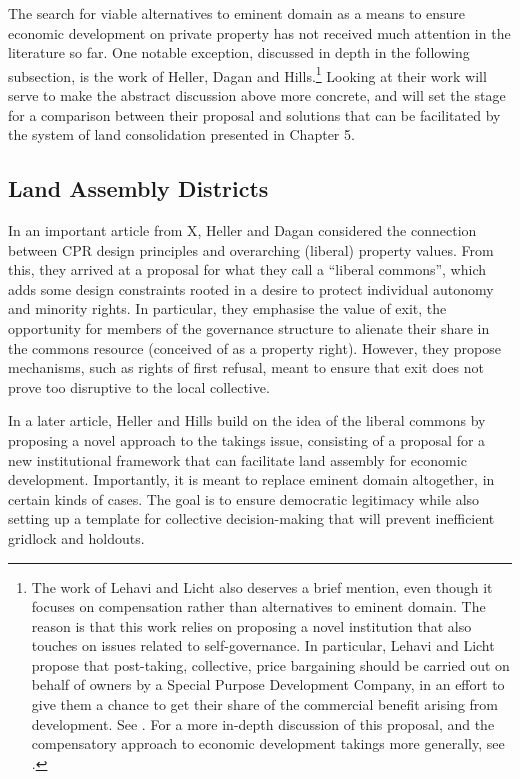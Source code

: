 The search for viable alternatives to eminent domain as a means to ensure economic development on  private property has not received much attention in the literature so far. One notable exception, discussed in depth in the following subsection, is the work of Heller, Dagan and Hills.\footnote{The work of Lehavi and Licht also deserves a brief mention, even though it focuses on compensation rather than alternatives to eminent domain. The reason is that this work relies on proposing a novel institution that also touches on issues related to self-governance. In particular, Lehavi and Licht propose that post-taking, collective, price bargaining should be carried out on behalf of owners by a Special Purpose Development Company, in an effort to give them a chance to get their share of the commercial benefit arising from development. See \cite{lehavi07}. For a more in-depth discussion of this proposal, and the compensatory approach to economic development takings more generally, see \cite{dyrkolbotn15}.} Looking at their work will serve to make the abstract discussion above more concrete, and will set the stage for a comparison between their proposal and solutions that can be facilitated by the system of land consolidation presented in Chapter 5.

\subsection{Land Assembly Districts}\label{sec:lad}

In an important article from X, Heller and Dagan considered the connection between CPR design principles and overarching (liberal) property values. From this, they arrived at a proposal for what they call a ``liberal commons'', which adds some design constraints rooted in a desire to protect individual autonomy and minority rights. In particular, they emphasise the value of exit, the opportunity for members of the governance structure to alienate their share in the commons resource (conceived of as a property right). However, they propose mechanisms, such as rights of first refusal, meant to ensure that exit does not prove too disruptive to the local collective.

In a later article, Heller and Hills build on the idea of the liberal commons by proposing a novel approach to the takings issue, consisting of a proposal for a new institutional framework that can facilitate land assembly for economic development. Importantly, it is meant to replace eminent domain altogether, in certain kinds of cases. The goal is to ensure democratic legitimacy while also setting up a template for collective decision-making that will prevent inefficient gridlock and holdouts. 

